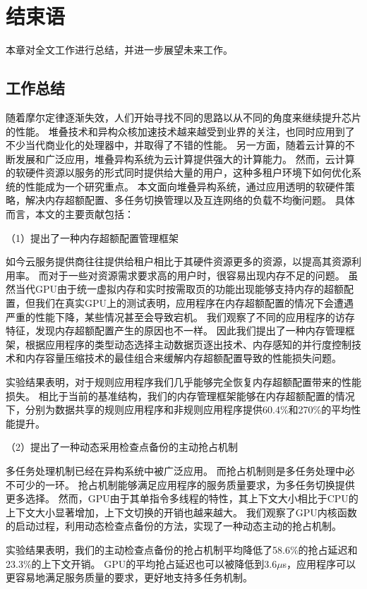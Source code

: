 \chapter{结束语}
\label{chap:conclusion}

本章对全文工作进行总结，并进一步展望未来工作。

\section{工作总结}
随着摩尔定律逐渐失效，人们开始寻找不同的思路以从不同的角度来继续提升芯片的性能。
堆叠技术和异构众核加速技术越来越受到业界的关注，也同时应用到了不少当代商业化的处理器中，并取得了不错的性能。
另一方面，随着云计算的不断发展和广泛应用，堆叠异构系统为云计算提供强大的计算能力。
然而，云计算的软硬件资源以服务的形式同时提供给大量的用户，这种多租户环境下如何优化系统的性能成为一个研究重点。
本文面向堆叠异构系统，通过应用透明的软硬件策略，解决内存超额配置、多任务切换管理以及互连网络的负载不均衡问题。
具体而言，本文的主要贡献包括：

（1）提出了一种内存超额配置管理框架

如今云服务提供商往往提供给租户相比于其硬件资源更多的资源，以提高其资源利用率。
而对于一些对资源需求要求高的用户时，很容易出现内存不足的问题。
虽然当代GPU由于统一虚拟内存和实时按需取页的功能出现能够支持内存的超额配置，但我们在真实GPU上的测试表明，应用程序在内存超额配置的情况下会遭遇严重的性能下降，某些情况甚至会导致宕机。
我们观察了不同的应用程序的访存特征，发现内存超额配置产生的原因也不一样。
因此我们提出了一种内存管理框架，根据应用程序的类型动态选择主动数据页逐出技术、内存感知的并行度控制技术和内存容量压缩技术的最佳组合来缓解内存超额配置导致的性能损失问题。

实验结果表明，对于规则应用程序我们几乎能够完全恢复内存超额配置带来的性能损失。
相比于当前的基准结构，我们的内存管理框架能够在内存超额配置的情况下，分别为数据共享的规则应用程序和非规则应用程序提供60.4\%和270\%的平均性能提升。

（2）提出了一种动态采用检查点备份的主动抢占机制

多任务处理机制已经在异构系统中被广泛应用。
而抢占机制则是多任务处理中必不可少的一环。
抢占机制能够满足应用程序的服务质量要求，为多任务切换提供更多选择。
然而，GPU由于其单指令多线程的特性，其上下文大小相比于CPU的上下文大小显著增加，上下文切换的开销也越来越大。
我们观察了GPU内核函数的启动过程，利用动态检查点备份的方法，实现了一种动态主动的抢占机制。

实验结果表明，我们的主动检查点备份的抢占机制平均降低了58.6\%的抢占延迟和23.3\%的上下文开销。
GPU的平均抢占延迟也可以被降低到3.6$\mu$s，应用程序可以更容易地满足服务质量的要求，更好地支持多任务机制。

